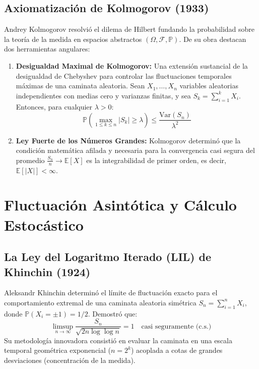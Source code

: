 \documentclass[11pt,a4paper]{article}
\begin{document}
\subsection{Axiomatización de Kolmogorov (1933)}
Andrey Kolmogorov resolvió el dilema de Hilbert fundando la probabilidad sobre la teoría de la medida en espacios abstractos $(\Omega, \mathcal{F}, \mathbb{P})$. De su obra destacan dos herramientas angulares:
\begin{enumerate}
    \item \textbf{Desigualdad Maximal de Kolmogorov:} Una extensión sustancial de la desigualdad de Chebyshev para controlar las fluctuaciones temporales máximas de una caminata aleatoria. Sean $X_1, \dots, X_n$ variables aleatorias independientes con medias cero y varianzas finitas, y sea $S_k = \sum_{i=1}^k X_i$. Entonces, para cualquier $\lambda > 0$:
    \begin{equation}
    \mathbb{P}\left(\max_{1 \le k \le n} |S_k| \ge \lambda\right) \le \frac{\text{Var}(S_n)}{\lambda^2}
    \end{equation}
    \item \textbf{Ley Fuerte de los Números Grandes:} Kolmogorov determinó que la condición matemática afilada y necesaria para la convergencia casi segura del promedio $\frac{S_n}{n} \to \mathbb{E}[X]$ es la integrabilidad de primer orden, es decir, $\mathbb{E}[|X|] < \infty$.
\end{enumerate}

\section{Fluctuación Asintótica y Cálculo Estocástico}

\subsection{La Ley del Logaritmo Iterado (LIL) de Khinchin (1924)}
Aleksandr Khinchin determinó el límite de fluctuación exacto para el comportamiento extremal de una caminata aleatoria simétrica $S_n = \sum_{i=1}^n X_i$, donde $\mathbb{P}(X_i = \pm 1) = 1/2$. Demostró que:
\begin{equation}
\limsup_{n\to\infty} \frac{S_n}{\sqrt{2n \log \log n}} = 1 \quad \text{casi seguramente (c.s.)}
\end{equation}
Su metodología innovadora consistió en evaluar la caminata en una escala temporal geométrica exponencial ($n = 2^k$) acoplada a cotas de grandes desviaciones (concentración de la medida).
\end{document}
